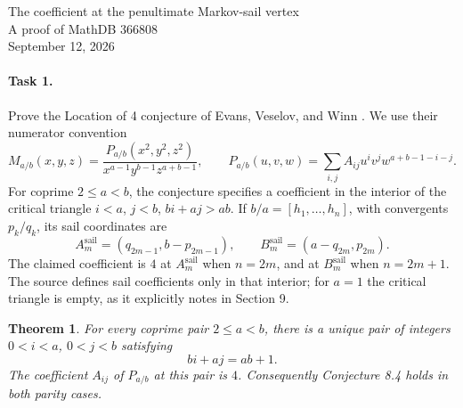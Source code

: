 \documentclass[11pt]{article}
\newtheorem{theorem}{Theorem}
\begin{document}
\begin{center}
{\Large The coefficient at the penultimate Markov-sail vertex}\\[0.5em]
A proof of MathDB 366808\\
September 12, 2026
\end{center}

\paragraph{Task 1.}
Prove the Location of 4 conjecture of Evans, Veselov, and Winn
\cite[Conjecture 8.4]{EVW}. We use their numerator convention
\[
 M_{a/b}(x,y,z)=
 \frac{P_{a/b}(x^2,y^2,z^2)}{x^{a-1}y^{b-1}z^{a+b-1}},
 \qquad
 P_{a/b}(u,v,w)=\sum_{i,j} A_{ij}u^iv^jw^{a+b-1-i-j}.
\]
For coprime $2\leq a<b$, the conjecture specifies a coefficient in the
interior of the critical triangle
$i<a$, $j<b$, $bi+aj>ab$.
If $b/a=[h_1,\ldots,h_n]$, with convergents $p_k/q_k$, its sail
coordinates are
\[
 A_m^{\mathrm{sail}}=(q_{2m-1},b-p_{2m-1}),\qquad
 B_m^{\mathrm{sail}}=(a-q_{2m},p_{2m}).
\]
The claimed coefficient is $4$ at $A_m^{\mathrm{sail}}$ when $n=2m$,
and at $B_m^{\mathrm{sail}}$ when $n=2m+1$.
The source defines sail coefficients only in that interior; for
$a=1$ the critical triangle is empty, as it explicitly notes in
Section 9.

\begin{theorem}
For every coprime pair $2\leq a<b$, there is a unique pair of integers
$0<i<a$, $0<j<b$ satisfying
\[
 bi+aj=ab+1.
\]
The coefficient $A_{ij}$ of $P_{a/b}$ at this pair is $4$.
Consequently Conjecture 8.4 holds in both parity cases.
\end{theorem}
\end{document}
